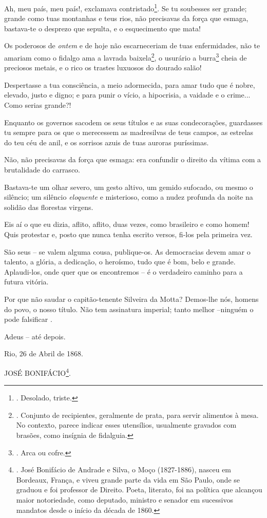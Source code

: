 Ah, meu país, meu país!, exclamava contristado\footnote{. Desolado,
  triste.}. Se tu soubesses ser grande; grande como tuas montanhas e
teus rios, não precisavas da força que esmaga, bastava-te o desprezo que
sepulta, e o esquecimento que mata!

Os poderosos de \emph{ontem} e de hoje não escarneceriam de tuas
enfermidades, não te amariam como o fidalgo ama a lavrada
baixela\footnote{. Conjunto de recipientes, geralmente de prata, para
  servir alimentos à mesa. No contexto, parece indicar esses utensílios,
  usualmente gravados com brasões, como insígnia de fidalguia.}, o
usurário a burra\footnote{. Arca ou cofre.} cheia de preciosos metais, e
o rico os trastes luxuosos do dourado salão!

Despertasse a tua consciência, a meio adormecida, para amar tudo que é
nobre, elevado, justo e digno; e para punir o vício, a hipocrisia, a
vaidade e o crime... Como serias grande?!

Enquanto os governos sacodem os seus títulos e as suas condecorações,
guardasses tu sempre para os que o merecessem as madresilvas de teus
campos, as estrelas do teu céu de anil, e os sorrisos azuis de tuas
auroras puríssimas.

Não, não precisavas da força que esmaga: era confundir o direito da
vítima com a brutalidade do carrasco.

Bastava-te um olhar severo, um gesto altivo, um gemido sufocado, ou
mesmo o silêncio; um silêncio \emph{eloquente} e misterioso, como a
nudez profunda da noite na solidão das florestas virgens.

Eis aí o que eu dizia, aflito, aflito, duas vezes, como brasileiro e
como homem! Quis protestar e, posto que nunca tenha escrito versos,
fi-los pela primeira vez.

São seus -- se valem alguma cousa, publique-os. As democracias devem
amar o talento, a glória, a dedicação, o heroísmo, tudo que é bom, belo
e grande. Aplaudi-los, onde quer que os encontremos -- é o verdadeiro
caminho para a futura vitória.

Por que não saudar o capitão-tenente Silveira da Motta? Demos-lhe nós,
homens do povo, o nosso título. Não tem assinatura imperial; tanto
melhor --ninguém o pode falsificar .

Adeus -- até depois.

Rio, 26 de Abril de 1868.

JOSÉ BONIFÁCIO\footnote{. José Bonifácio de Andrade e Silva, o Moço
  (1827-1886), nasceu em Bordeaux, França, e viveu grande parte da vida
  em São Paulo, onde se graduou e foi professor de Direito. Poeta,
  literato, foi na política que alcançou maior notoriedade, como
  deputado, ministro e senador em sucessivos mandatos desde o início da
  década de 1860.}.

